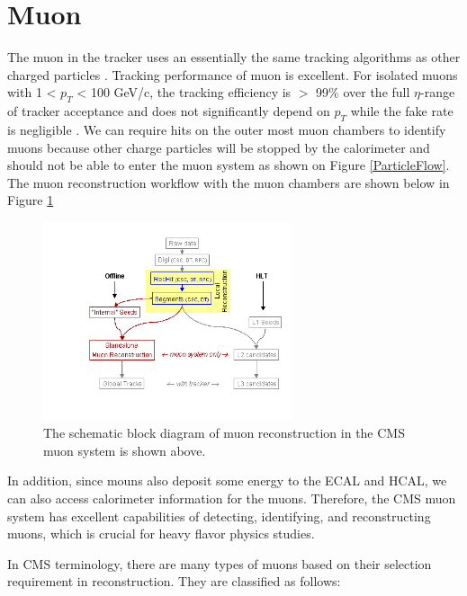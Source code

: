 \section{Muon}

The muon in the tracker uses an essentially the same tracking algorithms as other charged particles \cite{CMSTrackComp}. Tracking performance of muon is excellent. For isolated muons with 1 < $p_T$ < 100 GeV/c, the tracking efficiency is $>$ 99\% over the full $\eta$-range of tracker acceptance and does not significantly depend on $p_T$ while the fake rate is negligible \cite{CMSTrackComp}. We can require hits on the outer most muon chambers to identify muons because other charge particles will be stopped by the calorimeter and should not be able to enter the muon system as shown on Figure \ref{ParticleFlow}. The muon reconstruction workflow with the muon chambers are shown below in Figure \ref{MuonReco}


\begin{figure}[hbtp]
\begin{center}
\includegraphics[width=0.65\textwidth]{Figures/Chapter3/MuonReco.png}
\caption{The schematic block diagram of muon reconstruction in the CMS muon system is shown above.}
\label{MuonReco}
\end{center}
\end{figure} 

In addition, since mouns also deposit some energy to the ECAL and HCAL, we can also access calorimeter information for the muons. Therefore, the CMS muon system has excellent capabilities of detecting, identifying, and reconstructing muons, which is crucial for heavy flavor physics studies. 

In CMS terminology, there are many types of muons based on their selection requirement in reconstruction. They are classified as follows:



